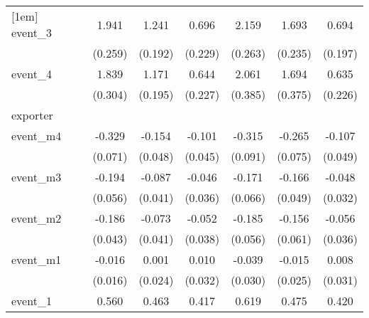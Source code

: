 {\begin{tabular}{l*{6}{c}}
[1em]
event\_3     &       1.941\sym{***}&       1.241\sym{***}&       0.696\sym{**} &       2.159\sym{***}&       1.693\sym{***}&       0.694\sym{***}\\
            &     (0.259)         &     (0.192)         &     (0.229)         &     (0.263)         &     (0.235)         &     (0.197)         \\
[1em]
event\_4     &       1.839\sym{***}&       1.171\sym{***}&       0.644\sym{**} &       2.061\sym{***}&       1.694\sym{***}&       0.635\sym{**} \\
            &     (0.304)         &     (0.195)         &     (0.227)         &     (0.385)         &     (0.375)         &     (0.226)         \\
\hline
exporter    &                     &                     &                     &                     &                     &                     \\
event\_m4    &      -0.329\sym{***}&      -0.154\sym{**} &      -0.101\sym{*}  &      -0.315\sym{***}&      -0.265\sym{***}&      -0.107\sym{*}  \\
            &     (0.071)         &     (0.048)         &     (0.045)         &     (0.091)         &     (0.075)         &     (0.049)         \\
[1em]
event\_m3    &      -0.194\sym{***}&      -0.087\sym{*}  &      -0.046         &      -0.171\sym{**} &      -0.166\sym{***}&      -0.048         \\
            &     (0.056)         &     (0.041)         &     (0.036)         &     (0.066)         &     (0.049)         &     (0.032)         \\
[1em]
event\_m2    &      -0.186\sym{***}&      -0.073         &      -0.052         &      -0.185\sym{**} &      -0.156\sym{*}  &      -0.056         \\
            &     (0.043)         &     (0.041)         &     (0.038)         &     (0.056)         &     (0.061)         &     (0.036)         \\
[1em]
event\_m1    &      -0.016         &       0.001         &       0.010         &      -0.039         &      -0.015         &       0.008         \\
            &     (0.016)         &     (0.024)         &     (0.032)         &     (0.030)         &     (0.025)         &     (0.031)         \\
[1em]
event\_1     &       0.560\sym{***}&       0.463\sym{***}&       0.417\sym{***}&       0.619\sym{***}&       0.475\sym{***}&       0.420\sym{***}\\

\end{tabular}}
